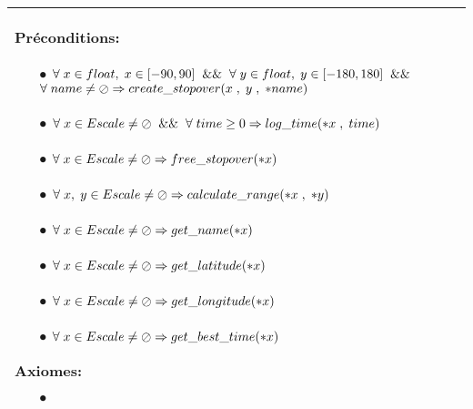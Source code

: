\documentclass[a4paper, 11pt, oneside]{article}
\begin{document}
\begin{tabular}{|p{17cm}|c}
			\textbf{Préconditions:}
				\begin{itemize}
					\item[$\bullet$] $\forall \hspace{1mm} x \in float, \hspace{1mm} x \in [-90,90] \hspace{2mm} \&\& \hspace{2mm} \forall \hspace{1mm} y \in float, \hspace{1mm} y \in [-180,180]  \hspace{2mm} \&\&$ \newline $\forall \hspace{1mm} name \neq \oslash \Rightarrow create\_stopover(x \hspace{1mm} , \hspace{1mm} y \hspace{1mm} , \hspace{1mm} *name)$
					\item[$\bullet$] $\forall \hspace{1mm} x \in Escale \neq \oslash \hspace{2mm} \&\& \hspace{2mm} \forall \hspace{1mm} time \geq 0 \Rightarrow log\_time(*x \hspace{1mm} , \hspace{1mm} time) $
					\item[$\bullet$] $\forall \hspace{1mm} x \in Escale \neq \oslash \Rightarrow free\_stopover(*x)$
					\item[$\bullet$] $\forall \hspace{1mm} x, \hspace{1mm} y \in Escale \neq \oslash \Rightarrow calculate\_range(*x \hspace{1mm} , \hspace{1mm} *y)$
					\item[$\bullet$] $\forall \hspace{1mm} x \in Escale \neq \oslash \Rightarrow get\_name(*x)$
					\item[$\bullet$] $\forall \hspace{1mm} x \in Escale \neq \oslash \Rightarrow get\_latitude(*x)$
					\item[$\bullet$] $\forall \hspace{1mm} x \in Escale \neq \oslash \Rightarrow get\_longitude(*x)$
					\item[$\bullet$] $\forall \hspace{1mm} x \in Escale \neq \oslash \Rightarrow get\_best\_time(*x)$
				\end{itemize}

			\textbf{Axiomes:}
				\begin{itemize}
					\item[$\bullet$]
				\end{itemize}

			\\
			\hline
		\end{tabular}
\end{document}
